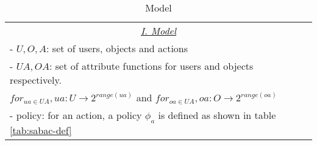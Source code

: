 
\newcommand{\policyEval}{\delta}
\begin{table*}
	\centering
	\caption{  \sABAC{} Model} %
	\label{tab:labac-definition}
	\begin{tabular}{|l|}						
		\hline					
		\multicolumn{1}{|c|}{\underline{\textit{I. \sABAC{} Model } } }\\	
		
	 	- $U, O, A$: set of users, objects and actions \\
	 	- $UA,OA$: set of attribute functions for users and objects respectively.   \\ \hfill	$for_{ua \in UA}, ua: U \to 2^{range(ua)} $ and
	 	$for_{oa \in UA}, oa: O \to 2^{range(oa)} $ \\
	 	- policy: for an action, a policy $\phi_a$ is defined as shown in table \ref{tab:sabac-def}\\
	 	 
	 
	 \hline	
	\end{tabular}
	
\end{table*}

